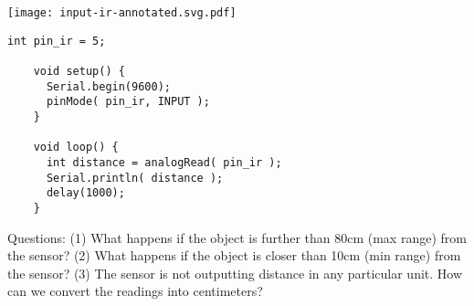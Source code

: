 \vspace{0.1in}
\begin{minipage}[t]{0.49\tw}
  \vspace{0pt}

  \texttt{[image: input-ir-annotated.svg.pdf]}
\end{minipage}
\hfill
\begin{minipage}[t]{0.49\tw}
  \vspace{0.1in}
  \begin{Verbatim}[gobble=3,fontsize=\small]
    int pin_ir = 5;

    void setup() {
      Serial.begin(9600);
      pinMode( pin_ir, INPUT );
    }

    void loop() {
      int distance = analogRead( pin_ir );
      Serial.println( distance );
      delay(1000);
    }
  \end{Verbatim}
\end{minipage}
\vspace{0.1in}

Questions: (1) What happens if the object is further than 80cm (max
range) from the sensor? (2) What happens if the object is closer than
10cm (min range) from the sensor? (3) The sensor is not outputting
distance in any particular unit. How can we convert the readings into
centimeters?

